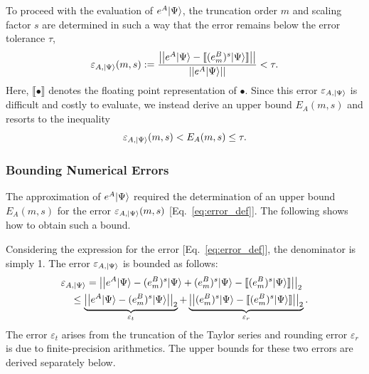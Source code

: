 To proceed with the evaluation of $e^A|\Psi\rangle$, the truncation order $m$ and scaling factor $s$ are determined in such a way that the error remains below the error tolerance $\tau$, 
\begin{equation}
\label{eq:error_def}
    \varepsilon_{A,|\Psi\rangle}(m,s) := \frac{\left|\left|e^A|\Psi\rangle-\llbracket (e^B_m)^s|\Psi\rangle\rrbracket\right|\right|}{\left|\left|e^A|\Psi\rangle\right|\right|}< \tau .
\end{equation}
Here, $\llbracket \bullet{}  \rrbracket$ denotes the floating point representation of $\bullet$. Since this error $\varepsilon_{A,|\Psi\rangle}$ is difficult and costly to evaluate, we instead derive an upper bound $E_A(m,s)$ and resorts to the inequality 
\begin{equation}
\label{eq:accuracy_inequality}
    \varepsilon_{A,|\Psi\rangle}(m,s)<E_A(m,s)\leq \tau.
\end{equation}

\subsubsection{Bounding Numerical Errors}
\label{subsubsec:ss-bounding-errors}
The approximation of $e^A|\Psi\rangle$ required the determination of an upper bound $E_A(m,s)$ for the error $\varepsilon_{A,|\Psi\rangle}(m,s)$ [Eq.~\eqref{eq:error_def}]. The following shows how to obtain such a bound.

Considering the expression for the error [Eq.~\eqref{eq:error_def}], the denominator is simply 1. The error $\varepsilon_{A,|\Psi\rangle}$ is bounded as follows:
\begin{align}
\nonumber    &\varepsilon_{A,|\Psi\rangle}
    =\left|\left|e^A|\Psi\rangle-(e^B_m)^s|\Psi\rangle+(e^B_m)^s|\Psi\rangle-\llbracket (e^B_m)^s|\Psi\rangle\rrbracket\right|\right|_2\\
\nonumber    &\quad \leq \underbrace{\left|\left|e^A|\Psi\rangle-(e^B_m)^s|\Psi\rangle\right|\right|_2}_{\varepsilon_t}+\underbrace{\left|\left|(e^B_m)^s|\Psi\rangle-\llbracket (e^B_m)^s|\Psi\rangle\rrbracket\right|\right|_2}_{\varepsilon_r}.\\
\label{eq:epsilonA}
\end{align}
The error $\varepsilon_t$ arises from the truncation of the Taylor series and rounding error $\varepsilon_r$ is due to finite-precision arithmetics. The upper bounds for these two errors are derived separately below.

